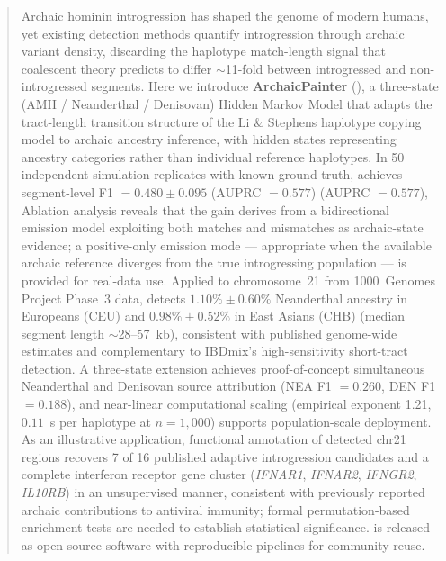 \begin{abstract}
Archaic hominin introgression has shaped the genome of modern humans,
yet existing detection methods quantify introgression through archaic variant density,
discarding the haplotype match-length signal that coalescent theory predicts to
differ $\sim$11-fold between introgressed and non-introgressed segments.
Here we introduce \textbf{ArchaicPainter} (\AP{}), a three-state
(AMH / Neanderthal / Denisovan) Hidden Markov Model that adapts the
tract-length transition structure of the Li \& Stephens haplotype copying model
to archaic ancestry inference, with hidden states representing ancestry
categories rather than individual reference haplotypes.
In 50 independent simulation replicates with known ground truth,
\AP{} achieves segment-level F1 $= 0.480 \pm 0.095$ (AUPRC $= 0.577$)
(AUPRC $= 0.577$),
Ablation analysis reveals that the gain derives from a bidirectional emission model
exploiting both matches and mismatches as archaic-state evidence;
a positive-only emission mode --- appropriate when the available archaic reference
diverges from the true introgressing population --- is provided for real-data use.
Applied to chromosome~21 from 1000~Genomes Project Phase~3 data,
\AP{} detects $1.10\% \pm 0.60\%$ Neanderthal ancestry in Europeans (CEU)
and $0.98\% \pm 0.52\%$ in East Asians (CHB)
(median segment length $\sim$28--57~kb), consistent with published genome-wide
estimates and complementary to IBDmix's high-sensitivity short-tract detection.
A three-state extension achieves proof-of-concept simultaneous Neanderthal and
Denisovan source attribution (NEA F1 $= 0.260$, DEN F1 $= 0.188$),
and near-linear computational scaling (empirical exponent 1.21, $0.11$~s per
haplotype at $n = 1{,}000$) supports population-scale deployment.
As an illustrative application, functional annotation of detected chr21 regions
recovers 7 of 16 published adaptive introgression candidates and a complete
interferon receptor gene cluster
(\textit{IFNAR1}, \textit{IFNAR2}, \textit{IFNGR2}, \textit{IL10RB})
in an unsupervised manner, consistent with previously reported archaic
contributions to antiviral immunity; formal permutation-based enrichment
tests are needed to establish statistical significance.
\AP{} is released as open-source software with reproducible pipelines
for community reuse.
\end{abstract}
